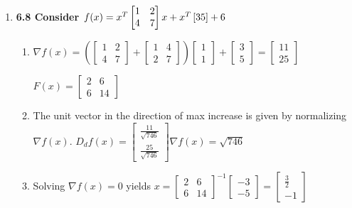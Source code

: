 \documentclass[10pt,a4paper]{article}
\begin{document}
\begin{enumerate}
    \item \textbf{6.8 Consider $f(x) = x^T \left[\begin{matrix} 1& 2 \\4 & 7 \end{matrix}\right] x + x^T\left[ 3 \\5 \right] + 6$}
    \begin{enumerate}
        \item $\nabla f(x) = \left( \left[\begin{matrix} 1& 2 \\4 & 7 \end{matrix}\right] + \left[\begin{matrix} 1& 4 \\2 & 7 \end{matrix}\right] \right)
        \left[ \begin{matrix} 1 \\ 1 \end{matrix}\right] + \begin{bmatrix} 3 \\ 5 \end{bmatrix} = \begin{bmatrix} 11 \\ 25\end{bmatrix}$

        $F(x) = \begin{bmatrix} 2 &6 \\ 6 & 14 \end{bmatrix} $

        \item The unit vector in the direction of max increase is given by normalizing $\nabla f(x)$. 
        $D_d f(x) = \begin{bmatrix} \frac{11}{\sqrt{746}} \\ \frac{25}{\sqrt{746}} \end{bmatrix} \nabla f(x) = \sqrt{746}$

        \item Solving $\nabla f(x) = 0$ yields $x = \begin{bmatrix} 2 & 6 \\ 6 & 14 \end{bmatrix}^{-1} \begin{bmatrix} -3 \\ -5 \end{bmatrix} = \begin{bmatrix} \frac{3}{2}  \\ -1\end{bmatrix}$
        

\end{enumerate}
\end{enumerate}
\end{document}
